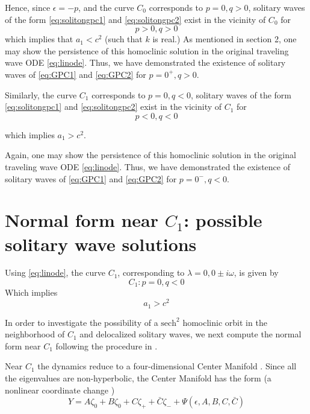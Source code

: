 Hence, since $\epsilon = - p $, and the curve $C_0$ corresponds to $p=0,q>0$, solitary waves of the 
form \eqref{eq:solitongpc1} and \eqref{eq:solitongpc2} exist in the vicinity of $C_0$ for 
\begin{equation}
p > 0, q > 0 
\end{equation}
which implies that $a_1 < c^2 $ (such that $k$ is real.)  As mentioned in section 2, one may show the persistence
of this homoclinic solution in the original traveling wave ODE \eqref{eq:linode}. Thus, we have 
demonstrated the existence of solitary waves of \eqref{eq:GPC1} and \eqref{eq:GPC2}  for $p=0^+, q>0$. 

Similarly, the curve $C_1$ corresponds to $p=0,q<0$, solitary waves of the form \eqref{eq:solitongpc1} and \eqref{eq:solitongpc2} exist
in the vicinity of $C_1$ for 
\begin{equation}
p < 0, q < 0 
\end{equation}

which implies $ a_1 > c^2 $.

Again, one may show the persistence
of this homoclinic solution in the original traveling wave ODE \eqref{eq:linode}. Thus, we have 
demonstrated the existence of solitary waves of \eqref{eq:GPC1} and \eqref{eq:GPC2} for $p=0^-, q<0$.


\section{Normal form near $C_1$: possible solitary wave solutions}
Using \eqref{eq:linode}, the curve $C_1$, corresponding to $\lambda = 0, 0\pm i \omega$, is given by
\begin{equation}\label{eq:c1}
C_1 : { p = 0, q < 0 }
\end{equation}
Which implies
\begin{equation}
a_1 > c^2
\end{equation}

In order to investigate the possibility of a $ \mathrm{sech}^2 $  homoclinic orbit in the neighborhood of $C_1$ and delocalized solitary
waves, we next compute the normal form near $C_1$ following the procedure in \cite{IA}.

Near $C_1$ the dynamics reduce to a four-dimensional Center Manifold \cite{IA}.
Since all the eigenvalues are non-hyperbolic, the Center Manifold has the form (a nonlinear coordinate change \cite{IA})
\begin{equation} \label{eq:c1cm}
Y = A \zeta_0 + B \zeta_0 + C \zeta_+ + \bar{C} \zeta_- + \Psi(\epsilon,A,B,C,\bar{C})
\end{equation}

